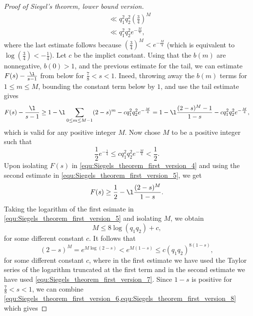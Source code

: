 \begin{proof}[Proof of Siegel's theorem, lower bound version]
\begin{align*}
          &\ll q_{1}^{2}q_{2}^{2}\left(\frac{3}{4}\right)^{M} \\
          &\ll q_{1}^{2}q_{2}^{2}e^{-\frac{M}{4}},
        \end{align*}
        where the last estimate follows because $(\frac{3}{4})^{M} < e^{-\frac{M}{4}}$ (which is equivalent to $\log\left(\frac{3}{4}\right) < -\frac{1}{4}$). Let $c$ be the implict constant. Using that the $b(m)$ are nonnegative, $b(0) > 1$, and the previous estimate for the tail, we can estimate $F(s)-\frac{\l}{s-1}$ from below for $\frac{7}{8} < s < 1$. Ineed, throwing away the $b(m)$ terms for $1 \le m \le M$, bounding the constant term below by $1$, and use the tail estimate gives
        \begin{equation}\label{equ:Siegels_theorem_first_version_4}
          F(s)-\frac{\l}{s-1} \ge 1-\l\sum_{0 \le m \le M-1}(2-s)^{m}-cq_{1}^{2}q_{2}^{2}e^{-\frac{M}{4}} = 1-\l\frac{(2-s)^{M}-1}{1-s}-cq_{1}^{2}q_{2}^{2}e^{-\frac{M}{4}},
        \end{equation}
        which is valid for any positive integer $M$. Now chose $M$ to be a positive integer such that
        \begin{equation}\label{equ:Siegels_theorem_first_version_5}
          \frac{1}{2}e^{-\frac{1}{4}} \le cq_{1}^{2}q_{2}^{2}e^{-\frac{M}{4}} < \frac{1}{2}.
        \end{equation}
        Upon isolating $F(s)$ in \cref{equ:Siegels_theorem_first_version_4} and using the second estimate in \cref{equ:Siegels_theorem_first_version_5}, we get
        \begin{equation}\label{equ:Siegels_theorem_first_version_6}
          F(s) \ge \frac{1}{2}-\l\frac{(2-s)^{M}}{1-s}.
        \end{equation}
        Taking the logarithm of the first esimate in \cref{equ:Siegels_theorem_first_version_5} and isolating $M$, we obtain
        \begin{equation}\label{equ:Siegels_theorem_first_version_7}
          M \le 8\log(q_{1}q_{2})+c,
        \end{equation}
        for some different constant $c$. It follows that
        \begin{equation}\label{equ:Siegels_theorem_first_version_8}
          (2-s)^{M} = e^{M\log(2-s)} < e^{M(1-s)} \le c(q_{1}q_{2})^{8(1-s)},
        \end{equation}
        for some different constant $c$, where in the first estimate we have used the Taylor series of the logarithm truncated at the first term and in the second estimate we have used \cref{equ:Siegels_theorem_first_version_7}. Since $1-s$ is positive for $\frac{7}{8} < s < 1$, we can combine \cref{equ:Siegels_theorem_first_version_6,equ:Siegels_theorem_first_version_8} which gives

\end{proof}
